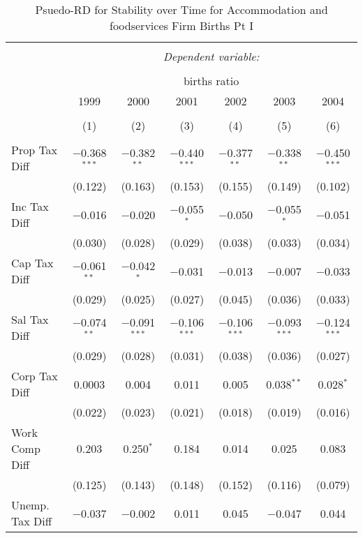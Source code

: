
\begin{table}[!htbp] \centering 
  \caption{Psuedo-RD for Stability over Time for  Accommodation and foodservices Firm Births Pt I} 
  \label{72year} 
\small 
\begin{tabular}{@{\extracolsep{5pt}}lcccccc} 
\\[-1.8ex]\hline 
\hline \\[-1.8ex] 
 & \multicolumn{6}{c}{\textit{Dependent variable:}} \\ 
\cline{2-7} 
\\[-1.8ex] & \multicolumn{6}{c}{births ratio} \\ 
 & 1999 & 2000 & 2001 & 2002 & 2003 & 2004 \\ 
\\[-1.8ex] & (1) & (2) & (3) & (4) & (5) & (6)\\ 
\hline \\[-1.8ex] 
 Prop Tax Diff & $-$0.368$^{***}$ & $-$0.382$^{**}$ & $-$0.440$^{***}$ & $-$0.377$^{**}$ & $-$0.338$^{**}$ & $-$0.450$^{***}$ \\ 
  & (0.122) & (0.163) & (0.153) & (0.155) & (0.149) & (0.102) \\ 
  Inc Tax Diff & $-$0.016 & $-$0.020 & $-$0.055$^{*}$ & $-$0.050 & $-$0.055$^{*}$ & $-$0.051 \\ 
  & (0.030) & (0.028) & (0.029) & (0.038) & (0.033) & (0.034) \\ 
  Cap Tax Diff & $-$0.061$^{**}$ & $-$0.042$^{*}$ & $-$0.031 & $-$0.013 & $-$0.007 & $-$0.033 \\ 
  & (0.029) & (0.025) & (0.027) & (0.045) & (0.036) & (0.033) \\ 
  Sal Tax Diff & $-$0.074$^{**}$ & $-$0.091$^{***}$ & $-$0.106$^{***}$ & $-$0.106$^{***}$ & $-$0.093$^{***}$ & $-$0.124$^{***}$ \\ 
  & (0.029) & (0.028) & (0.031) & (0.038) & (0.036) & (0.027) \\ 
  Corp Tax Diff & 0.0003 & 0.004 & 0.011 & 0.005 & 0.038$^{**}$ & 0.028$^{*}$ \\ 
  & (0.022) & (0.023) & (0.021) & (0.018) & (0.019) & (0.016) \\ 
  Work Comp Diff & 0.203 & 0.250$^{*}$ & 0.184 & 0.014 & 0.025 & 0.083 \\ 
  & (0.125) & (0.143) & (0.148) & (0.152) & (0.116) & (0.079) \\ 
  Unemp. Tax Diff & $-$0.037 & $-$0.002 & 0.011 & 0.045 & $-$0.047 & 0.044 \\ 

\end{tabular}
\end{table}
